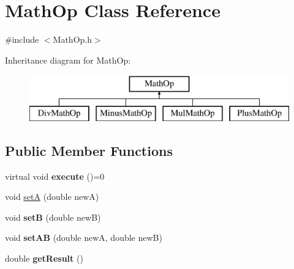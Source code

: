 \hypertarget{class_math_op}{}\section{Math\+Op Class Reference}
\label{class_math_op}


{\ttfamily \#include $<$Math\+Op.\+h$>$}

Inheritance diagram for Math\+Op\+:\begin{figure}[H]
\begin{center}
\leavevmode
\includegraphics[height=2.000000cm]{class_math_op}
\end{center}
\end{figure}
\subsection*{Public Member Functions}
\begin{DoxyCompactItemize}
\item 
\hypertarget{class_math_op_a7eb54cf02054e4c65afd93f0e1f54833}{}virtual void {\bfseries execute} ()=0\label{class_math_op_a7eb54cf02054e4c65afd93f0e1f54833}

\item 
void \hyperlink{class_math_op_aaf00128f671302d984bb32e488229616}{set\+A} (double new\+A)
\item 
\hypertarget{class_math_op_a6e61ab8362a050d0b79fc854457eec03}{}void {\bfseries set\+B} (double new\+B)\label{class_math_op_a6e61ab8362a050d0b79fc854457eec03}

\item 
\hypertarget{class_math_op_a99e27af1ed722c942d4018b7384b0dff}{}void {\bfseries set\+A\+B} (double new\+A, double new\+B)\label{class_math_op_a99e27af1ed722c942d4018b7384b0dff}

\item 
\hypertarget{class_math_op_a45e51beba01736ca71ccd641eec4b433}{}double {\bfseries get\+Result} ()\label{class_math_op_a45e51beba01736ca71ccd641eec4b433}

\end{DoxyCompactItemize}
